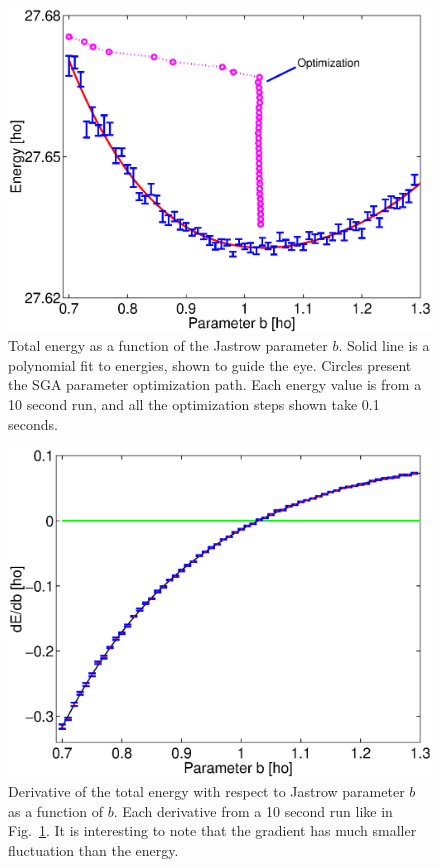 \documentclass{article}
\begin{document}
%
\begin{figure}[hbt] 
\begin{center}
 \includegraphics[width=0.99\columnwidth]{EP.eps}
\caption{Total energy as a function of the Jastrow parameter
$b$. Solid line is a polynomial fit to energies, shown to guide the
eye.  Circles present the SGA parameter optimization path. Each energy
value is from a 10 second run, and all the optimization steps shown
take 0.1 seconds.}
\label{SGA1}
\end{center}
\end{figure}
%
\begin{figure}[hbt] 
\begin{center}
 \includegraphics[width=0.99\columnwidth]{gEP.eps}
\caption{Derivative of the total energy with respect to Jastrow
parameter $b$ as a function of $b$. Each derivative from a 10
second run like in Fig.~\ref{SGA1}. It is interesting to note
that the gradient has much smaller fluctuation than the energy.}
\label{SGA2}
\end{center}
\end{figure}
\end{document}

